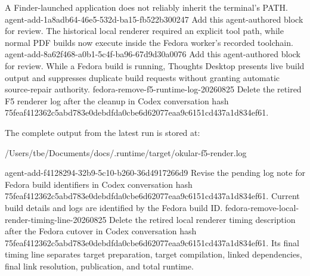 A Finder-launched application does not reliably inherit the terminal's PATH.
\agentProposedEdit
  {agent-add-1a8adb64-46e5-532d-ba15-fb522b300247}
  {Add this agent-authored block for review.}
  {}
  {The historical local renderer required an explicit tool path, while normal PDF builds now execute inside the Fedora worker's recorded toolchain.}
\agentProposedEdit
  {agent-add-8a62f468-a0b1-5c4f-ba96-67d9d30a0076}
  {Add this agent-authored block for review.}
  {}
  {While a Fedora build is running, Thoughts Desktop presents live build output and suppresses duplicate build requests without granting automatic source-repair authority.}
\agentProposedEdit
  {fedora-remove-f5-runtime-log-20260825}
  {Delete the retired F5 renderer log after the cleanup in Codex conversation hash 75feaf412362c5abd783e0debdfda0cbe6d62077eaa9c6151cd437a1d834ef61.}
  {The complete output from the latest run is stored at:
\begin{DocCode}
/Users/tbe/Documents/docs/.runtime/target/okular-f5-render.log
\end{DocCode}}
  {}
\agentProposedEdit
  {agent-add-f4128294-32b9-5c10-b260-36d4917266d9}
  {Revise the pending log note for Fedora build identifiers in Codex conversation hash 75feaf412362c5abd783e0debdfda0cbe6d62077eaa9c6151cd437a1d834ef61.}
  {}
  {Current build details and logs are identified by the Fedora build ID.}
\agentProposedEdit
  {fedora-remove-local-render-timing-line-20260825}
  {Delete the retired local renderer timing description after the Fedora cutover in Codex conversation hash 75feaf412362c5abd783e0debdfda0cbe6d62077eaa9c6151cd437a1d834ef61.}
  {Its final timing line separates target preparation, target compilation, linked dependencies, final link resolution, publication, and total runtime.}
  {}

